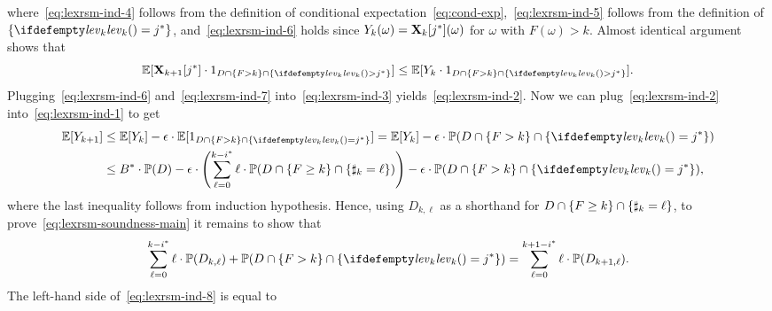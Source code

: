 where~\eqref{eq:lexrsm-ind-4} follows from the definition of conditional expectation~\eqref{eq:cond-exp},~\eqref{eq:lexrsm-ind-5} follows from the definition of $\{\levelrank{}{k}=\fixn{j}\}$, and~\eqref{eq:lexrsm-ind-6} holds since $Y_k(\omega)=\mathbf{X}_{k}[{j}^*](\omega)$ for $\omega$ with $F(\omega)> k$. Almost identical argument shows that
\begin{equation}
\label{eq:lexrsm-ind-7}
\E[\vecseq{X}{k+1}{\fixn{j}}\cdot \indicator{D\cap \{F > k \} \cap \{\levelrank{}{k}>\fixn{j} \} }] \leq \E[Y_k\cdot \indicator{D\cap \{F > k \} \cap \{\levelrank{}{k}>\fixn{j} \}}].
\end{equation}
Plugging~\eqref{eq:lexrsm-ind-6} and~\eqref{eq:lexrsm-ind-7} into~\eqref{eq:lexrsm-ind-3} yields~\eqref{eq:lexrsm-ind-2}. Now we can plug~\eqref{eq:lexrsm-ind-2} into~\eqref{eq:lexrsm-ind-1} to get
\begin{align}
\E[Y_{k+1}]&\leq \E[Y_k] - \eps\cdot \E[\indicator{D \cap \{F>k\} \cap \{\levelrank{}{k} = \fixn{j} \} }] = \E[Y_k] - \eps\cdot \probm(D \cap \{F>k\} \cap \{\levelrank{}{k} = \fixn{j} \} ) \nonumber\\
&\leq \fixn{B}\cdot \probm(D) - \eps\cdot\left(\sum_{\ell=0}^{k-\fixn{i}} \ell\cdot\probm(D 
\cap \{F\geq k\} \cap \{\noofdec_k = \ell\})\right) -\eps\cdot \probm(D \cap \{F>k\} \cap \{\levelrank{}{k} = \fixn{j} \}),
\end{align}
where the last inequality follows from induction hypothesis. Hence, using $D_{k,\ell}$ as a shorthand for $D 
\cap \{F\geq k\} \cap \{\sharp_k = \ell\}$, to prove~\eqref{eq:lexrsm-soundness-main} it remains to show that
\begin{equation}
\label{eq:lexrsm-ind-8}
\sum_{\ell=0}^{k-\fixn{i}} \ell\cdot\probm(D_{k,\ell}) + \probm(D \cap \{F>k\} \cap \{\levelrank{}{k} = \fixn{j} \}) = \sum_{\ell=0}^{k+1-\fixn{i}} \ell\cdot\probm(D_{k+1,\ell}).
\end{equation}
The left-hand side of~\eqref{eq:lexrsm-ind-8} is equal to
